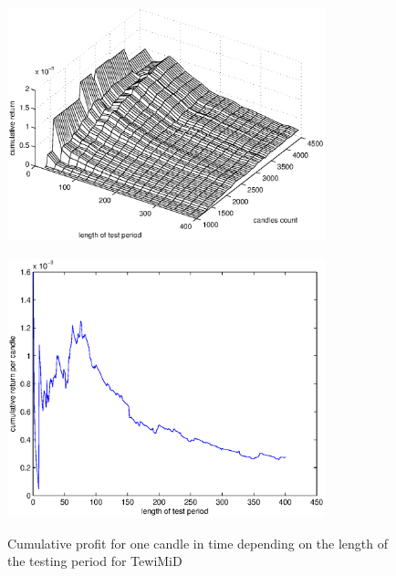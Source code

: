 \documentclass{tewiart}
\begin{document}
\begin{figure}[h!]
\centering
\begin{minipage}{.49\linewidth}
\begin{center}
\includegraphics[width=0.82\textwidth]{pictures/cumulativeReturnsPerCandleD.eps}
\label{Cum3DPerCMiD}
\end{center}
\end{minipage}
\begin{minipage}{.49\linewidth}
\begin{center}
\includegraphics[width=0.82\textwidth]{pictures/mid_percandle_end.eps}
\label{Cum3DPerCMiDend}
\end{center}
\end{minipage}
\caption{Cumulative profit for one candle in time depending on the length of the testing period for TewiMiD}
\end{figure}
\FloatBarrier
\end{document}
